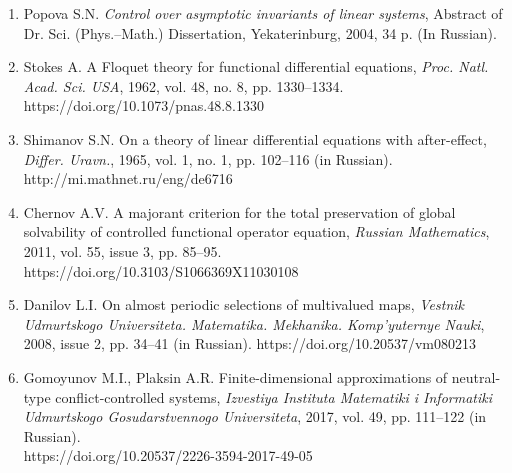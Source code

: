 \documentclass[12pt,a4paper,twoside]{article}  %
\begin{document}
\begin{enumerate}

\item
Popova S.N. {\it Control over asymptotic invariants of linear systems}, Abstract of Dr. Sci. (Phys.--Math.) Dissertation, Yekaterinburg, 2004, 34 p. (In Russian).


\item
Stokes A. A Floquet theory for functional differential equations, {\it Proc. Natl. Acad. Sci. USA}, 1962, vol. 48,  no. 8, pp. 1330--1334.
https://doi.org/10.1073/pnas.48.8.1330

\item
Shimanov S.N. On a theory of linear differential equations with after-effect, {\it Differ. Uravn.}, 1965, vol. 1, no. 1, pp. 102--116 (in Russian).
http://mi.mathnet.ru/eng/de6716

\item
Chernov A.V. A majorant criterion for the total preservation of global solvability of controlled functional operator equation, {\it Russian Mathematics}, 2011, vol. 55, issue 3, pp. 85--95.\\
https://doi.org/10.3103/S1066369X11030108


\item
Danilov L.I. On almost periodic selections of multivalued maps, {\it Vestnik Udmurtskogo Universiteta. Matematika. Mekhanika. Komp'yuternye Nauki}, 2008, issue 2, pp. 34--41 (in Russian).
https://doi.org/10.20537/vm080213


\item
Gomoyunov M.I., Plaksin A.R.
Finite-dimensional approximations of neutral-type conflict-controlled systems, {\it Izvestiya Instituta Matematiki i Informatiki Udmurtskogo Gosudarstvennogo Universiteta},
2017, vol. 49, pp. 111--122 (in Russian). \\
https://doi.org/10.20537/2226-3594-2017-49-05



\end{enumerate}
\end{document}
